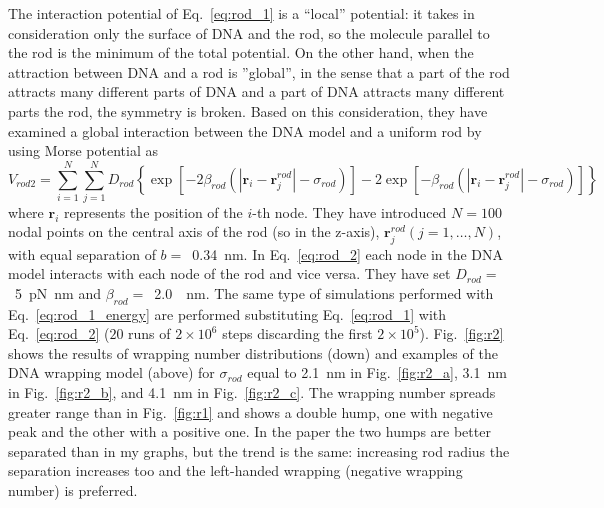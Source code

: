 \documentclass[a4paper,10pt]{article}
\begin{document}
The interaction potential of Eq.~\ref{eq:rod_1} is a ``local'' potential: it takes in consideration only the surface of DNA and the rod, so the molecule parallel to the rod is the minimum of the total potential.
On the other hand, when the attraction between DNA and a rod is ''global'', in the sense that a part of the rod attracts many different parts of DNA and a part of DNA attracts many different parts the rod, the symmetry is broken.
Based on this consideration, they have examined a global interaction between the DNA model and a uniform rod by using Morse potential as
\begin{equation}\label{eq:rod_2}
V_{rod2}=\sum^{N}_{i=1}\sum^{N}_{j=1}D_{rod}\left \{\exp\left [-2\beta_{rod}\left (\left |\textbf{r}_{i}-\textbf{r}_{j}^{rod}\right |-\sigma_{rod}\right )\right ]-2\exp\left [-\beta_{rod}\left (\left |\textbf{r}_{i}-\textbf{r}_{j}^{rod}\right |-\sigma_{rod}\right )\right ]\right \}
\end{equation}
where $\textbf{r}_{i}$ represents the position of the $i$-th node.
They have introduced $N=100$ nodal points on the central axis of the rod (so in the z-axis), $\textbf{r}_{j}^{rod} \left (j=1,\dots,N\right )$, with equal separation of $b=$~\SI{.34}{\nm}.
In Eq.~\ref{eq:rod_2} each node in the DNA model interacts with each node of the rod and vice versa.
They have set $D_{rod}=$~\SI{5}{\pico\newton\nano\meter} and $\beta_{rod}=$~\SI{2.0}{\per\nm}.
The same type of simulations performed with Eq.~\ref{eq:rod_1_energy} are performed substituting Eq.~\ref{eq:rod_1} with Eq.~\ref{eq:rod_2} ($20$ runs of $2\times 10^6$ steps discarding the first $2\times 10^5$).
Fig.~\ref{fig:r2} shows the results of wrapping number distributions (down) and examples of the DNA wrapping model (above) for $\sigma_{rod}$ equal to \SI{2.1}{\nm} in Fig.~\ref{fig:r2_a}, \SI{3.1}{\nm} in Fig.~\ref{fig:r2_b}, and \SI{4.1}{\nm} in Fig.~\ref{fig:r2_c}.
The wrapping number spreads greater range than in Fig.~\ref{fig:r1} and shows a double hump, one with negative peak and the other with a positive one.
In the paper the two humps are better separated than in my graphs, but the trend is the same: increasing rod radius the separation increases too and the left-handed wrapping (negative wrapping number) is preferred.
\end{document}
